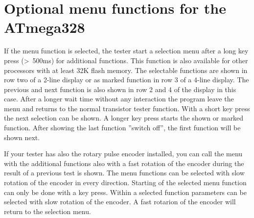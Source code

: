 \section{Optional menu functions for the ATmega328}
If the menu function is selected, the tester start a selection menu after a long key press (\textgreater~500ms)
for additional functions.
This function is also available for other processors with at least 32K flash memory.
The selectable functions are shown in row two of a 2-line display or as marked function in row 3 of a 4-line display.
The previous and next function is also shown in row 2 and 4 of the display in this case.
After a longer wait time without any interaction the program leave the menu and returns to the normal transistor tester function.
With a short key press the next selection can be shown.
A longer key press starts the shown or marked function.
After showing the last function ''switch off'', the first function will be shown next.

If your tester has also the rotary pulse encoder installed, you can call the menu with the additional functions
also with a fast rotation of the encoder during the result of a previous test is shown.
The menu functions can be selected with slow rotation of the encoder in every direction.
Starting of the selected menu function can only be done with a key press.
Within a selected function parameters can be selected with slow rotation of the encoder.
A fast rotarion of the encoder will return to the selection menu.

